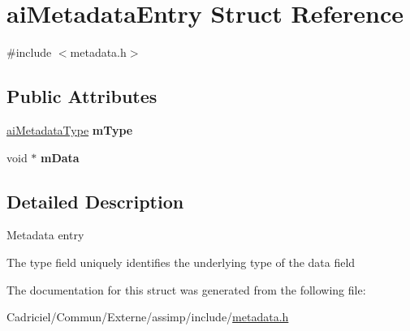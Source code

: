 \hypertarget{structai_metadata_entry}{}\section{ai\+Metadata\+Entry Struct Reference}
\label{structai_metadata_entry}


{\ttfamily \#include $<$metadata.\+h$>$}

\subsection*{Public Attributes}
\begin{DoxyCompactItemize}
\item 
\hyperlink{metadata_8h_aa910906c37416da57bb36335a4d04232}{ai\+Metadata\+Type} {\bfseries m\+Type}\hypertarget{structai_metadata_entry_a075b29cd710e153f5402f479a7a10aee}{}\label{structai_metadata_entry_a075b29cd710e153f5402f479a7a10aee}

\item 
void $\ast$ {\bfseries m\+Data}\hypertarget{structai_metadata_entry_a97fe80a47846374edd38bda5b50b99b3}{}\label{structai_metadata_entry_a97fe80a47846374edd38bda5b50b99b3}

\end{DoxyCompactItemize}


\subsection{Detailed Description}
Metadata entry

The type field uniquely identifies the underlying type of the data field 

The documentation for this struct was generated from the following file\+:\begin{DoxyCompactItemize}
\item 
Cadriciel/\+Commun/\+Externe/assimp/include/\hyperlink{metadata_8h}{metadata.\+h}\end{DoxyCompactItemize}

